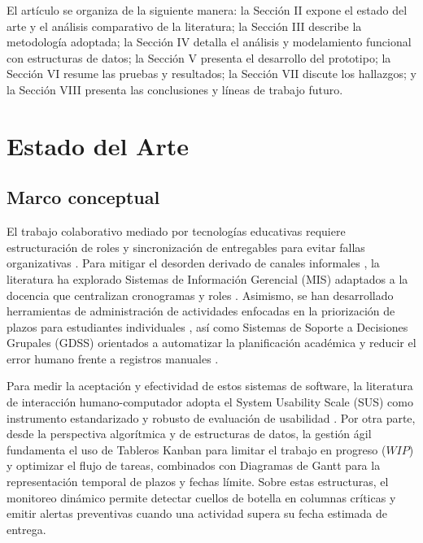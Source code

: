 \documentclass[conference]{IEEEtran}
\begin{document}
El artículo se organiza de la siguiente manera: la Sección II expone el estado del arte y el análisis comparativo de la literatura; la Sección III describe la metodología adoptada; la Sección IV detalla el análisis y modelamiento funcional con estructuras de datos; la Sección V presenta el desarrollo del prototipo; la Sección VI resume las pruebas y resultados; la Sección VII discute los hallazgos; y la Sección VIII presenta las conclusiones y líneas de trabajo futuro.

\section{Estado del Arte}
\subsection{Marco conceptual}
El trabajo colaborativo mediado por tecnologías educativas requiere estructuración de roles y sincronización de entregables para evitar fallas organizativas \cite{hussein2021addressing, sobaih2021responses}. Para mitigar el desorden derivado de canales informales \cite{vilches2019limitaciones}, la literatura ha explorado Sistemas de Información Gerencial (MIS) adaptados a la docencia que centralizan cronogramas y roles \cite{akram2024gams}. Asimismo, se han desarrollado herramientas de administración de actividades enfocadas en la priorización de plazos para estudiantes individuales \cite{nurzi2022task}, así como Sistemas de Soporte a Decisiones Grupales (GDSS) orientados a automatizar la planificación académica y reducir el error humano frente a registros manuales \cite{siddiqui2018gdss}.

Para medir la aceptación y efectividad de estos sistemas de software, la literatura de interacción humano-computador adopta el System Usability Scale (SUS) como instrumento estandarizado y robusto de evaluación de usabilidad \cite{brooke1996sus}. Por otra parte, desde la perspectiva algorítmica y de estructuras de datos, la gestión ágil fundamenta el uso de Tableros Kanban para limitar el trabajo en progreso ($WIP$) y optimizar el flujo de tareas, combinados con Diagramas de Gantt para la representación temporal de plazos y fechas límite. Sobre estas estructuras, el monitoreo dinámico permite detectar cuellos de botella en columnas críticas y emitir alertas preventivas cuando una actividad supera su fecha estimada de entrega.
\end{document}
